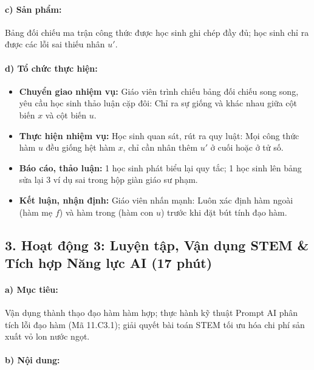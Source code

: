 \documentclass[12pt, a4paper]{article}
\begin{document}
\paragraph{c) Sản phẩm:} Bảng đối chiếu ma trận công thức được học sinh ghi chép đầy đủ; học sinh chỉ ra được các lỗi sai thiếu nhân $u'$.

\paragraph{d) Tổ chức thực hiện:}
\begin{itemize}[leftmargin=0.8cm]
    \item \textbf{Chuyển giao nhiệm vụ:} Giáo viên trình chiếu bảng đối chiếu song song, yêu cầu học sinh thảo luận cặp đôi: Chỉ ra sự giống và khác nhau giữa cột biến $x$ và cột biến $u$.
    \item \textbf{Thực hiện nhiệm vụ:} Học sinh quan sát, rút ra quy luật: Mọi công thức hàm $u$ đều giống hệt hàm $x$, chỉ cần nhân thêm $u'$ ở cuối hoặc ở tử số.
    \item \textbf{Báo cáo, thảo luận:} 1 học sinh phát biểu lại quy tắc; 1 học sinh lên bảng sửa lại 3 ví dụ sai trong hộp giàn giáo sư phạm.
    \item \textbf{Kết luận, nhận định:} Giáo viên nhấn mạnh: Luôn xác định hàm ngoài (hàm mẹ $f$) và hàm trong (hàm con $u$) trước khi đặt bút tính đạo hàm.
\end{itemize}

\subsection*{3. Hoạt động 3: Luyện tập, Vận dụng STEM & Tích hợp Năng lực AI (17 phút)}

\paragraph{a) Mục tiêu:} Vận dụng thành thạo đạo hàm hàm hợp; thực hành kỹ thuật Prompt AI phân tích lỗi đạo hàm (Mã 11.C3.1); giải quyết bài toán STEM tối ưu hóa chi phí sản xuất vỏ lon nước ngọt.

\paragraph{b) Nội dung:}
\end{document}
